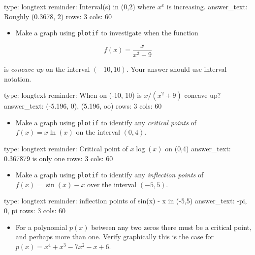 \documentclass[12pt]{article}
\begin{document}
\begin{answer}
type: longtext
reminder: Interval(s) in (0,2) where \( x^x \) is increasing.
answer_text: Roughly (0.3678, 2) 
rows: 3
cols: 60
\end{answer}

\begin{itemize}
\itemsep1pt\parskip0pt
\item
  Make a graph using \texttt{plotif} to investigate when the function
\end{itemize}

\[
f(x) = \frac{x}{x^2+9}
\]

is \emph{concave up} on the interval $(-10,10)$. Your answer should use
interval notation.

\begin{answer}
type: longtext
reminder: When on (-10, 10) is \( x/(x^2 + 9) \) concave up?
answer_text: (-5.196, 0), (5.196, oo) 
rows: 3
cols: 60
\end{answer}

\begin{itemize}
\itemsep1pt\parskip0pt
\item
  Make a graph using \texttt{plotif} to identify any \emph{critical
  points} of $f(x) = x \ln(x)$ on the interval $(0,4)$.
\end{itemize}

\begin{answer}
type: longtext
reminder: Critical point of \( x \log(x) \) on (0,4)
answer_text: 0.367879 is only one 
rows: 3
cols: 60
\end{answer}

\begin{itemize}
\itemsep1pt\parskip0pt
\item
  Make a graph using \texttt{plotif} to identify any \emph{inflection
  points} of $f(x) = \sin(x) - x$ over the interval $(-5,5)$.
\end{itemize}

\begin{answer}
type: longtext
reminder: inflection points of sin(x) - x in (-5,5)
answer_text: -pi, 0, pi 
rows: 3
cols: 60
\end{answer}

\begin{itemize}
\itemsep1pt\parskip0pt
\item
  For a polynomial $p(x)$ between any two zeros there must be a critical
  point, and perhaps more than one. Verify graphically this is the case
  for $p(x) =x^4 + x^3 - 7x^2 - x + 6$.
\end{itemize}
\end{document}

